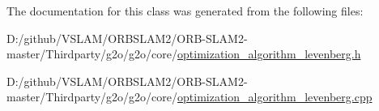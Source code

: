 The documentation for this class was generated from the following files\+:\begin{DoxyCompactItemize}
\item 
D\+:/github/\+V\+S\+L\+A\+M/\+O\+R\+B\+S\+L\+A\+M2/\+O\+R\+B-\/\+S\+L\+A\+M2-\/master/\+Thirdparty/g2o/g2o/core/\mbox{\hyperlink{optimization__algorithm__levenberg_8h}{optimization\+\_\+algorithm\+\_\+levenberg.\+h}}\item 
D\+:/github/\+V\+S\+L\+A\+M/\+O\+R\+B\+S\+L\+A\+M2/\+O\+R\+B-\/\+S\+L\+A\+M2-\/master/\+Thirdparty/g2o/g2o/core/\mbox{\hyperlink{optimization__algorithm__levenberg_8cpp}{optimization\+\_\+algorithm\+\_\+levenberg.\+cpp}}\end{DoxyCompactItemize}

